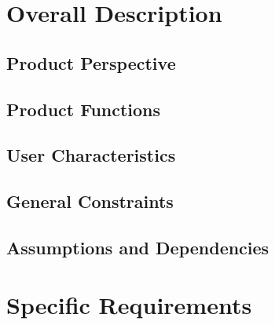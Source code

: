 \documentclass[11pt]{article}
\begin{document}
\section{Overall Description}

\subsection{Product Perspective}

\subsection{Product Functions}

\subsection{User Characteristics}

\subsection{General Constraints}

\subsection{Assumptions and Dependencies}

\section{Specific Requirements}

\end{document}
